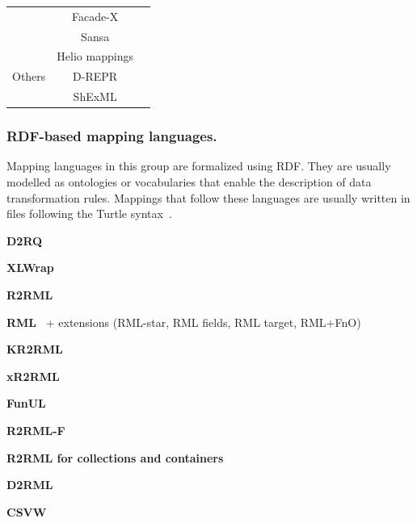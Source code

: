\begin{table}[t]
\begin{tabular}{c|c|c}
                              & Facade-X        & \parencite{asprino2023sparql-anything,sparqlanything}\\ \cline{2-3}
                              & Sansa            & \parencite{stadler2023spark}\\ \hline
\multirow{3}{*}{Others}       & Helio mappings  & \parencite{cimmino2022helio}\\ \cline{2-3} 
                              & D-REPR          & \parencite{Vu2019d-repr}\\ \cline{2-3} 
                              & ShExML          & \parencite{Garcia-Gonzalez2020shexml,shexml}\\  \hline
\end{tabular}
\end{table}




\subsubsection{RDF-based mapping languages.} 

Mapping languages in this group are formalized using RDF. They are usually modelled as ontologies or vocabularies that enable the description of data transformation rules. Mappings that follow these languages are usually written in files following the Turtle syntax~\parencite{turtle}. 



\noindent\textbf{D2RQ}~\parencite{bizer2004d2rq}

\noindent\textbf{XLWrap}~\parencite{langegger2009xlwrap}

\noindent\textbf{R2RML}~\parencite{das2012r2rml} 

\noindent\textbf{RML}~\parencite{Dimou2014rml} + extensions (RML-star, RML fields, RML target, RML+FnO)

\noindent\textbf{KR2RML}~\parencite{slepicka2015kr2rml}

\noindent\textbf{xR2RML}~\parencite{michel2015xr2rml}

\noindent\textbf{FunUL}~\parencite{junior2016funul}

\noindent\textbf{R2RML-F}~\parencite{debruyne2016r2rmlf}

\noindent\textbf{R2RML for collections and containers}~\parencite{debruyne2017R2RML-collections}

\noindent\textbf{D2RML}~\parencite{chortaras2018d2rml}

\noindent\textbf{CSVW}~\parencite{Tennison2015csvw}

